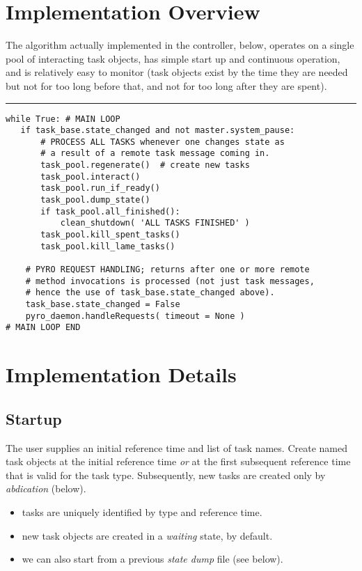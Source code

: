 \documentclass[11pt,a4paper]{report}
\begin{document}
\section{Implementation Overview}

The algorithm actually implemented in the controller, below, operates on
a single pool of interacting task objects, has simple start up and
continuous operation, and is relatively easy to monitor (task objects
exist by the time they are needed but not for too long before that, and
not for too long after they are spent). 

\pagebreak

\noindent
\rule{5cm}{.2mm}
\begin{lstlisting}
while True: # MAIN LOOP
   if task_base.state_changed and not master.system_pause:
       # PROCESS ALL TASKS whenever one changes state as
       # a result of a remote task message coming in.
       task_pool.regenerate()  # create new tasks
       task_pool.interact()
       task_pool.run_if_ready()
       task_pool.dump_state()
       if task_pool.all_finished():
           clean_shutdown( 'ALL TASKS FINISHED' )
       task_pool.kill_spent_tasks()
       task_pool.kill_lame_tasks()

    # PYRO REQUEST HANDLING; returns after one or more remote
    # method invocations is processed (not just task messages, 
    # hence the use of task_base.state_changed above).
    task_base.state_changed = False
    pyro_daemon.handleRequests( timeout = None )
# MAIN LOOP END
\end{lstlisting}


\section{Implementation Details}

\subsection{Startup}

The user supplies an initial reference time and list of task names.
Create named task objects at the initial reference time {\em or} at the
first subsequent reference time that is valid for the task type.
Subsequently, new tasks are created only by {\em abdication} (below).
    \begin{itemize}
        \item tasks are uniquely identified by type and reference time. 
        \item new task objects are created in a {\em waiting} state, by
        default.
        \item we can also start from a previous {\em state dump} file
        (see below).
    \end{itemize}
\end{document}
